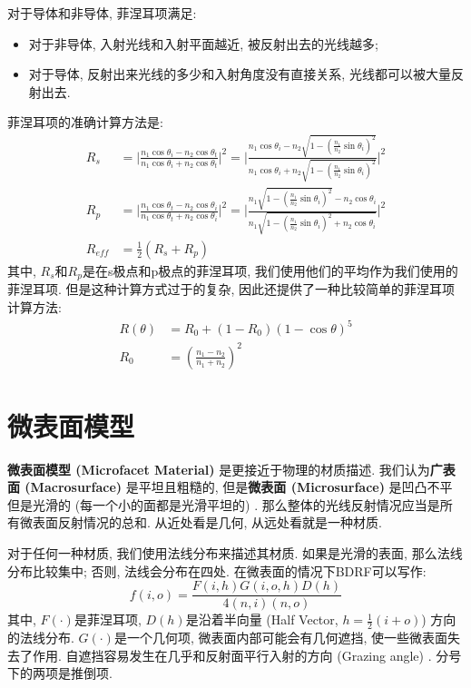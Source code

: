 对于导体和非导体, 菲涅耳项满足: 
\begin{itemize}
	\item 对于非导体, 入射光线和入射平面越近, 被反射出去的光线越多; 
	\item 对于导体, 反射出来光线的多少和入射角度没有直接关系, 光线都可以被大量反射出去. 
\end{itemize}

菲涅耳项的准确计算方法是: 
\begin{equation}
	\begin{split}
		R_s&= \lvert\frac{n_1\cos\theta_i-n_2\cos\theta_t}{n_1\cos\theta_i+n_2\cos\theta_t}\rvert^2 = \lvert{\frac{n_1\cos\theta_i-n_2\sqrt{1-(\frac{n_1}{n_2}\sin\theta_i)^2}}{n_1\cos\theta_i+n_2\sqrt{1-(\frac{n_1}{n_2}\sin\theta_i)^2}}}\rvert^2\\
		R_p&= \lvert\frac{n_1\cos\theta_t-n_2\cos\theta_i}{n_1\cos\theta_t+n_2\cos\theta_i}\rvert^2 = \lvert{\frac{n_1\sqrt{1-(\frac{n_1}{n_2}\sin\theta_i)^2}-n_2\cos\theta_i}{n_1\sqrt{1-(\frac{n_1}{n_2}\sin\theta_i)^2+n_2\cos\theta_i}}}\rvert^2\\
		R_{eff}&=\frac{1}{2}(R_s+R_p)
	\end{split}
\end{equation}
其中, $R_s$和$R_p$是在s极点和p极点的菲涅耳项, 我们使用他们的平均作为我们使用的菲涅耳项. 但是这种计算方式过于的复杂, 因此还提供了一种比较简单的菲涅耳项计算方法: 
\begin{equation}
	\begin{split}
		R(\theta)&=R_0+(1-R_0)(1-\cos\theta)^5\\
		R_0&=(\frac{n_1-n_2}{n_1+n_2})^2
	\end{split}
\end{equation}

\section{微表面模型}

\textbf{微表面模型 (Microfacet Material) }是更接近于物理的材质描述. 我们认为\textbf{广表面 (Macrosurface) }是平坦且粗糙的, 但是\textbf{微表面 (Microsurface) }是凹凸不平但是光滑的 (每一个小的面都是光滑平坦的) . 那么整体的光线反射情况应当是所有微表面反射情况的总和. 从近处看是几何, 从远处看就是一种材质. 

对于任何一种材质, 我们使用法线分布来描述其材质. 如果是光滑的表面, 那么法线分布比较集中; 否则, 法线会分布在四处. 在微表面的情况下BDRF可以写作: 
\begin{equation}
	f(i,o)=\frac{F(i,h)G(i,o,h)D(h)}{4(n,i)(n,o)}
\end{equation}
其中, $F(\cdot)$是菲涅耳项, $D(h)$是沿着半向量 (Half Vector, $h=\frac{1}{2}(i+o)$) 方向的法线分布. $G(\cdot)$是一个几何项, 微表面内部可能会有几何遮挡, 使一些微表面失去了作用. 自遮挡容易发生在几乎和反射面平行入射的方向 (Grazing angle) . 分号下的两项是推倒项. 

